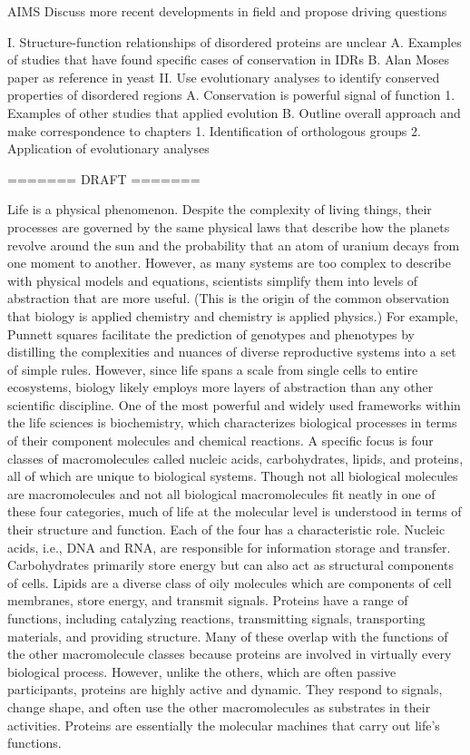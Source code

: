 AIMS
Discuss more recent developments in field and propose driving questions

I. Structure-function relationships of disordered proteins are unclear
    A. Examples of studies that have found specific cases of conservation in IDRs
    B. Alan Moses paper as reference in yeast
II. Use evolutionary analyses to identify conserved properties of disordered regions
    A. Conservation is powerful signal of function
        1. Examples of other studies that applied evolution
    B. Outline overall approach and make correspondence to chapters
        1. Identification of orthologous groups
        2. Application of evolutionary analyses

======= DRAFT =======

Life is a physical phenomenon. Despite the complexity of living things, their processes are governed by the same physical laws that describe how the planets revolve around the sun and the probability that an atom of uranium decays from one moment to another. However, as many systems are too complex to describe with physical models and equations, scientists simplify them into levels of abstraction that are more useful. (This is the origin of the common observation that biology is applied chemistry and chemistry is applied physics.) For example, Punnett squares facilitate the prediction of genotypes and phenotypes by distilling the complexities and nuances of diverse reproductive systems into a set of simple rules. However, since life spans a scale from single cells to entire ecosystems, biology likely employs more layers of abstraction than any other scientific discipline. One of the most powerful and widely used frameworks within the life sciences is biochemistry, which characterizes biological processes in terms of their component molecules and chemical reactions. A specific focus is four classes of macromolecules called nucleic acids, carbohydrates, lipids, and proteins, all of which are unique to biological systems. Though not all biological molecules are macromolecules and not all biological macromolecules fit neatly in one of these four categories, much of life at the molecular level is understood in terms of their structure and function. Each of the four has a characteristic role. Nucleic acids, i.e., DNA and RNA, are responsible for information storage and transfer. Carbohydrates primarily store energy but can also act as structural components of cells. Lipids are a diverse class of oily molecules which are components of cell membranes, store energy, and transmit signals. Proteins have a range of functions, including catalyzing reactions, transmitting signals, transporting materials, and providing structure. Many of these overlap with the functions of the other macromolecule classes because proteins are involved in virtually every biological process. However, unlike the others, which are often passive participants, proteins are highly active and dynamic. They respond to signals, change shape, and often use the other macromolecules as substrates in their activities. Proteins are essentially the molecular machines that carry out life's functions.

